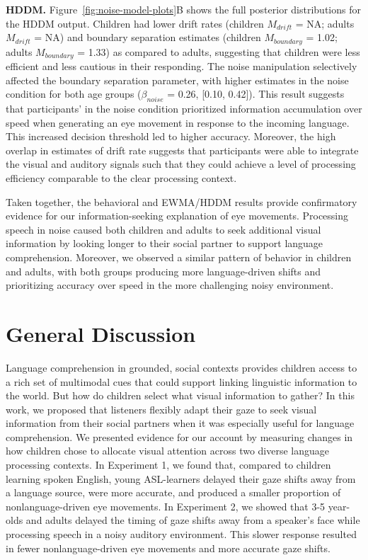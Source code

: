 \documentclass[english,floatsintext,man]{apa6}
\begin{document}
\textbf{HDDM.} Figure~\ref{fig:noise-model-plots}B shows the full
posterior distributions for the HDDM output. Children had lower drift
rates (children \(M_{drift}\) = NA; adults \(M_{drift}\) = NA) and
boundary separation estimates (children \(M_{boundary}\) = 1.02; adults
\(M_{boundary}\) = 1.33) as compared to adults, suggesting that children
were less efficient and less cautious in their responding. The noise
manipulation selectively affected the boundary separation parameter,
with higher estimates in the noise condition for both age groups
(\(\beta_{noise}\) = 0.26, {[}0.10, 0.42{]}). This result suggests that
participants' in the noise condition prioritized information
accumulation over speed when generating an eye movement in response to
the incoming language. This increased decision threshold led to higher
accuracy. Moreover, the high overlap in estimates of drift rate suggests
that participants were able to integrate the visual and auditory signals
such that they could achieve a level of processing efficiency comparable
to the clear processing context.

Taken together, the behavioral and EWMA/HDDM results provide
confirmatory evidence for our information-seeking explanation of eye
movements. Processing speech in noise caused both children and adults to
seek additional visual information by looking longer to their social
partner to support language comprehension. Moreover, we observed a
similar pattern of behavior in children and adults, with both groups
producing more language-driven shifts and prioritizing accuracy over
speed in the more challenging noisy environment.

\hypertarget{general-discussion}{%
\section{General Discussion}\label{general-discussion}}

Language comprehension in grounded, social contexts provides children
access to a rich set of multimodal cues that could support linking
linguistic information to the world. But how do children select what
visual information to gather? In this work, we proposed that listeners
flexibly adapt their gaze to seek visual information from their social
partners when it was especially useful for language comprehension. We
presented evidence for our account by measuring changes in how children
chose to allocate visual attention across two diverse language
processing contexts. In Experiment 1, we found that, compared to
children learning spoken English, young ASL-learners delayed their gaze
shifts away from a language source, were more accurate, and produced a
smaller proportion of nonlanguage-driven eye movements. In Experiment 2,
we showed that 3-5 year-olds and adults delayed the timing of gaze
shifts away from a speaker's face while processing speech in a noisy
auditory environment. This slower response resulted in fewer
nonlanguage-driven eye movements and more accurate gaze shifts.
\end{document}
